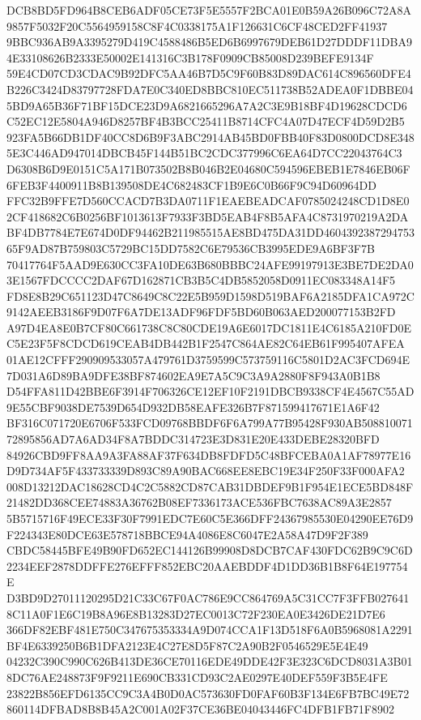 \documentclass[UTF8,fontset=fandol,zihao=-4,a4paper]{ctexart}
\begin{document}
{{DCB8BD5FD964B8CEB6ADF05CE73F5E5557F2BCA01E0B59A26B096C72A8A9857F5032F20C5564959158C8F4C0338175A1F126631C6CF48CED2FF41937
9BBC936AB9A3395279D419C4588486B5ED6B6997679DEB61D27DDDF11DBA94E33108626B2333E50002E141316C3B178F0909CB85008D239BEFE9134F
59E4CD07CD3CDAC9B92DFC5AA46B7D5C9F60B83D89DAC614C896560DFE4B226C3424D83797728FDA7E0C340ED8BBC810EC511738B52ADEA0F1DBBE04
5BD9A65B36F71BF15DCE23D9A6821665296A7A2C3E9B18BF4D19628CDCD6C52EC12E5804A946D8257BF4B3BCC25411B8714CFC4A07D47ECF4D59D2B5
923FA5B66DB1DF40CC8D6B9F3ABC2914AB45BD0FBB40F83D0800DCD8E3485E3C446AD947014DBCB45F144B51BC2CDC377996C6EA64D7CC22043764C3
D6308B6D9E0151C5A171B073502B8B046B2E04680C594596EBEB1E7846EB06F6FEB3F4400911B8B139508DE4C682483CF1B9E6C0B66F9C94D60964DD
FFC32B9FFE7D560CCACD7B3DA0711F1EAEBEADCAF0785024248CD1D8E02CF418682C6B0256BF1013613F7933F3BD5EAB4F8B5AFA4C8731970219A2DA
BF4DB7784E7E674D0DF94462B211985515AE8BD475DA31DD460439238729475365F9AD87B759803C5729BC15DD7582C6E79536CB3995EDE9A6BF3F7B
70417764F5AAD9E630CC3FA10DE63B680BBBC24AFE99197913E3BE7DE2DA03E1567FDCCCC2DAF67D162871CB3B5C4DB5852058D0911EC083348A14F5
FD8E8B29C651123D47C8649C8C22E5B959D1598D519BAF6A2185DFA1CA972C9142AEEB3186F9D07F6A7DE13ADF96FDF5BD60B063AED200077153B2FD
A97D4EA8E0B7CF80C661738C8C80CDE19A6E6017DC1811E4C6185A210FD0EC5E23F5F8CDCD619CEAB4DB442B1F2547C864AE82C64EB61F995407AFEA
01AE12CFFF290909533057A479761D3759599C573759116C5801D2AC3FCD694E7D031A6D89BA9DFE38BF874602EA9E7A5C9C3A9A2880F8F943A0B1B8
D54FFA811D42BBE6F3914F706326CE12EF10F2191DBCB9338CF4E4567C55AD9E55CBF9038DE7539D654D932DB58EAFE326B7F871599417671E1A6F42
BF316C071720E6706F533FCD09768BBDF6F6A799A77B95428F930AB50881007172895856AD7A6AD34F8A7BDDC314723E3D831E20E433DEBE28320BFD
84926CBD9FF8AA9A3FA88AF37F634DB8FDFD5C48BFCEBA0A1AF78977E16D9D734AF5F433733339D893C89A90BAC668EE8EBC19E34F250F33F000AFA2
008D13212DAC18628CD4C2C5882CD87CAB31DBDEF9B1F954E1ECE5BD848F21482DD368CEE74883A36762B08EF7336173ACE536FBC7638AC89A3E2857
5B5715716F49ECE33F30F7991EDC7E60C5E366DFF24367985530E04290EE76D9F224343E80DCE63E578718BBCE94A4086E8C6047E2A58A47D9F2F389
CBDC58445BFE49B90FD652EC144126B99908D8DCB7CAF430FDC62B9C9C6D2234EEF2878DDFFE276EFFF852EBC20AAEBDDF4D1DD36B1B8F64E197754E
D3BD9D27011120295D21C33C67F0AC786E9CC864769A5C31CC7F3FFB0276418C11A0F1E6C19B8A96E8B13283D27EC0013C72F230EA0E3426DE21D7E6
366DF82EBF481E750C347675353334A9D074CCA1F13D518F6A0B5968081A2291BF4E6339250B6B1DFA2123E4C27E8D5F87C2A90B2F0546529E5E4E49
04232C390C990C626B413DE36CE70116EDE49DDE42F3E323C6DCD8031A3B018DC76AE248873F9F9211E690CB331CD93C2AE0297E40DEF559F3B5E4FE
23822B856EFD6135CC9C3A4B0D0AC573630FD0FAF60B3F134E6FB7BC49E72860114DFBAD8B8B45A2C001A02F37CE36BE04043446FC4DFB1FB71F8902
}}
\end{document}
